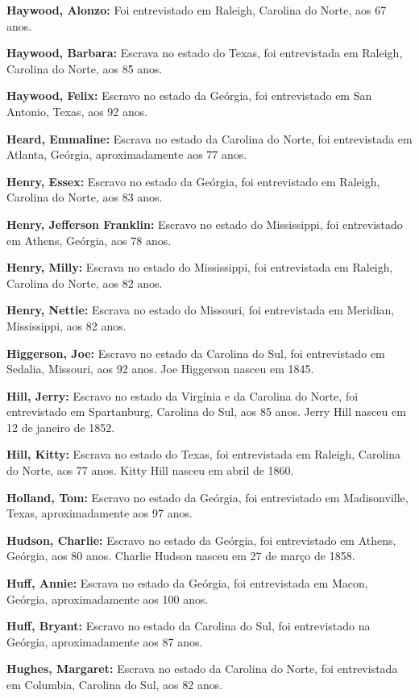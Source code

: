 \textbf{Haywood, Alonzo:} Foi entrevistado em Raleigh, Carolina do
Norte, aos 67 anos.

\textbf{Haywood, Barbara:} Escrava no estado do Texas, foi entrevistada
em Raleigh, Carolina do Norte, aos 85 anos.

\textbf{Haywood, Felix:} Escravo no estado da Geórgia, foi entrevistado
em San Antonio, Texas, aos 92 anos.

\textbf{Heard, Emmaline:} Escrava no estado da Carolina do Norte, foi
entrevistada em Atlanta, Geórgia, aproximadamente aos 77 anos.

\textbf{Henry, Essex:} Escravo no estado da Geórgia, foi entrevistado em
Raleigh, Carolina do Norte, aos 83 anos.

\textbf{Henry, Jefferson Franklin:} Escravo no estado do Mississippi,
foi entrevistado em Athens, Geórgia, aos 78 anos.

\textbf{Henry, Milly:} Escrava no estado do Mississippi, foi
entrevistada em Raleigh, Carolina do Norte, aos 82 anos.

\textbf{Henry, Nettie:} Escrava no estado do Missouri, foi entrevistada
em Meridian, Mississippi, aos 82 anos.

\textbf{Higgerson, Joe:} Escravo no estado da Carolina do Sul, foi
entrevistado em Sedalia, Missouri, aos 92 anos. Joe Higgerson nasceu em
1845.

\textbf{Hill, Jerry:} Escravo no estado da Virgínia e da Carolina do
Norte, foi entrevistado em Spartanburg, Carolina do Sul, aos 85 anos.
Jerry Hill nasceu em 12 de janeiro de 1852.

\textbf{Hill, Kitty:} Escrava no estado do Texas, foi entrevistada em
Raleigh, Carolina do Norte, aos 77 anos. Kitty Hill nasceu em abril de
1860.

\textbf{Holland, Tom:} Escravo no estado da Geórgia, foi entrevistado em
Madisonville, Texas, aproximadamente aos 97 anos.

\textbf{Hudson, Charlie:} Escravo no estado da Geórgia, foi entrevistado
em Athens, Geórgia, aos 80 anos. Charlie Hudson nasceu em 27 de março de
1858.

\textbf{Huff, Annie:} Escrava no estado da Geórgia, foi entrevistada em
Macon, Geórgia, aproximadamente aos 100 anos.

\textbf{Huff, Bryant:} Escravo no estado da Carolina do Sul, foi
entrevistado na Geórgia, aproximadamente aos 87 anos.

\textbf{Hughes, Margaret:} Escrava no estado da Carolina do Norte, foi
entrevistada em Columbia, Carolina do Sul, aos 82 anos.

